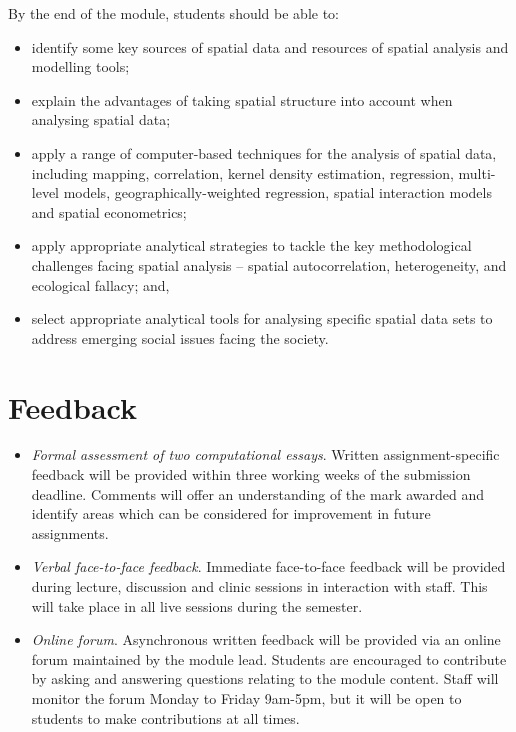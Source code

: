 \documentclass[
  letterpaper,
  DIV=11,
  numbers=noendperiod,
  oneside]{scrreprt}
\providecommand{\tightlist}{%
  \setlength{\itemsep}{0pt}\setlength{\parskip}{0pt}}\usepackage{longtable,booktabs,array}
\begin{document}
By the end of the module, students should be able to:

\begin{itemize}
\tightlist
\item
  identify some key sources of spatial data and resources of spatial
  analysis and modelling tools;
\item
  explain the advantages of taking spatial structure into account when
  analysing spatial data;
\item
  apply a range of computer-based techniques for the analysis of spatial
  data, including mapping, correlation, kernel density estimation,
  regression, multi-level models, geographically-weighted regression,
  spatial interaction models and spatial econometrics;
\item
  apply appropriate analytical strategies to tackle the key
  methodological challenges facing spatial analysis -- spatial
  autocorrelation, heterogeneity, and ecological fallacy; and,
\item
  select appropriate analytical tools for analysing specific spatial
  data sets to address emerging social issues facing the society.
\end{itemize}

\section{Feedback}\label{feedback}

\begin{itemize}
\item
  \emph{Formal assessment of two computational essays}. Written
  assignment-specific feedback will be provided within three working
  weeks of the submission deadline. Comments will offer an understanding
  of the mark awarded and identify areas which can be considered for
  improvement in future assignments.
\item
  \emph{Verbal face-to-face feedback}. Immediate face-to-face feedback
  will be provided during lecture, discussion and clinic sessions in
  interaction with staff. This will take place in all live sessions
  during the semester.
\item
  \emph{Online forum}. Asynchronous written feedback will be provided
  via an online forum maintained by the module lead. Students are
  encouraged to contribute by asking and answering questions relating to
  the module content. Staff will monitor the forum Monday to Friday
  9am-5pm, but it will be open to students to make contributions at all
  times.
\end{itemize}
\end{document}
